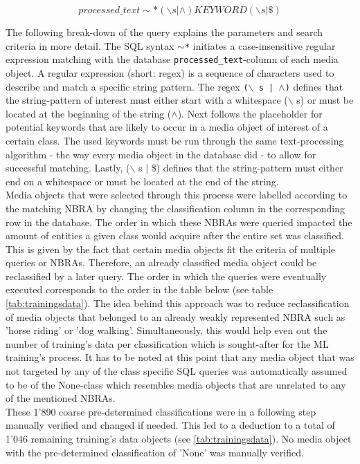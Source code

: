\[processed\_text \sim * (\backslash s | \wedge)KEYWORD(\backslash s | \$)\]

The following break-down of the query explains the parameters and search criteria in more detail. The SQL syntax \texttt{$\sim$*} initiates a case-insensitive regular expression matching with the database \texttt{processed\_text}-column of each media object. A regular expression (short: regex) is a sequence of characters used to describe and match a specific string pattern. The regex \texttt{($\backslash$ s | $\wedge$)} defines that the string-pattern of interest must either start with a whitespace ($\backslash$ s) or must be located at the beginning of the string ($\wedge$). Next follows the placeholder for potential keywords that are likely to occur in a media object of interest of a certain class. The used keywords must be run through the same text-processing algorithm - the way every media object in the database did - to allow for successful matching. Lastly, ($\backslash$ s | \$) defines that the string-pattern must either end on a whitespace or must be located at the end of the string.\\ 
Media objects that were selected through this process were labelled according to the matching NBRA by changing the classification column in the corresponding row in the database. The order in which these NBRAs were queried impacted the amount of entities a given class would acquire after the entire set was classified. This is given by the fact that certain media objects fit the criteria of multiple queries or NBRAs. Therefore, an already classified media object could be reclassified by a later query. The order in which the queries were eventually executed corresponds to the order in the table below (see table \ref{tab:trainingsdata}). The idea behind this approach was to reduce reclassification of media objects that belonged to an already weakly represented NBRA such as 'horse riding' or 'dog walking'. Simultaneously, this would help even out the number of training's data per classification which is sought-after for the ML training's process. It has to be noted at this point that any media object that was not targeted by any of the class specific SQL queries was automatically assumed to be of the None-class which resembles media objects that are unrelated to any of the mentioned NBRAs.\\
These 1'890 coarse pre-determined classifications were in a following step manually verified and changed if needed. This led to a deduction to a total of 1'046 remaining training's data objects (see \ref{tab:trainingsdata}). No media object with the pre-determined classification of 'None' was manually verified.\\

